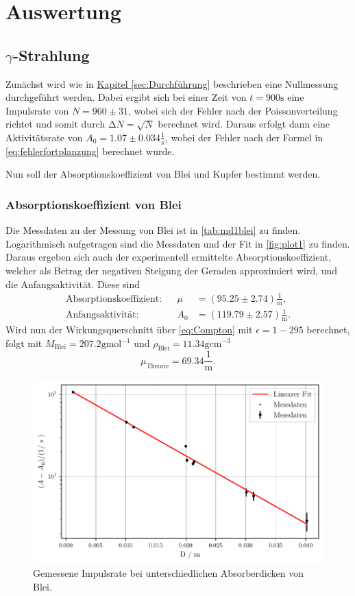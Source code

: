 \section{Auswertung}
\label{sec:Auswertung}
\subsection[Gamma-Strahlung]{$\gamma$-Strahlung}

Zunächst wird wie in \hyperref[sec:Durchführung]{Kapitel \ref{sec:Durchführung}} beschrieben eine Nullmessung durchgeführt werden.
Dabei ergibt sich bei einer Zeit von $t = 900 \unit\second$ eine Impulsrate von $N = 960 \pm 31$,
wobei sich der Fehler nach der Poissonverteilung richtet und somit durch $\increment N = \sqrt{N}$ berechnet wird.
Daraus erfolgt dann eine Aktivitätsrate von $A_0 = 1.07 \pm 0.034 \frac{1}{\unit\second}$, wobei der Fehler nach
der Formel in \autoref{eq:fehlerfortplanzung} berechnet wurde.

Nun soll der Absorptionskoeffizient von Blei und Kupfer bestimmt werden.

\subsubsection*{Absorptionskoeffizient von Blei}

Die Messdaten zu der Messung von Blei ist in \autoref{tab:md1blei} zu finden.
Logarithmisch aufgetragen sind die Messdaten und der Fit in \autoref{fig:plot1} zu finden.
Daraus ergeben sich auch der experimentell ermittelte Absorptionskoeffizient, welcher als Betrag der negativen Steigung der Geraden approximiert wird, und die Anfangsaktivität.
Diese sind
\begin{align*}
    \text{Absorptionskoeffizient:} && \mu &= (95.25 \pm 2.74) \frac{1}{\unit\meter},\\
    \text{Anfangsaktivität:} && A_0 &= (119.79 \pm 2.57) \frac{1}{\unit\meter}.
\end{align*} 
Wird nun der Wirkungsquerschnitt über \autoref{eq:Compton} mit $\epsilon = 1-295$ berechnet,
folgt mit $M_\text{Blei} = 207.2 \unit{\gram\mol^{-1}}$ \cite{molaremasse} und $ \rho_\text{Blei} = 11.34 \unit{\gram\centi\meter^{-3}}$
\begin{equation}
    \mu_\text{Theorie} = 69.34 \frac{1}{\unit\meter}.
\end{equation}


\begin{figure}
    \centering
    \includegraphics[width=0.7 \linewidth]{build/plot1.pdf}
    \caption{Gemessene Impulsrate bei unterschiedlichen Absorberdicken von Blei.}
    \label{fig:plot1}
\end{figure}


